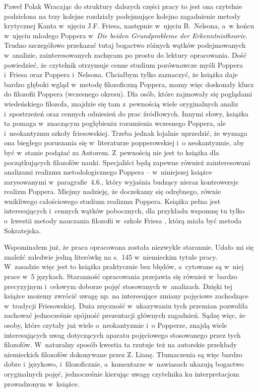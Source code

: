 \begin{newrevplenv}{Paweł Polak}
Wracając do struktury dalszych części pracy to jest ona czytelnie podzielona na trzy kolejne rozdziały podejmujące kolejno zagadnienie metody krytycznej Kanta w~ujęciu J.F. Friesa, następnie w~ujęciu B.~Nelsona, a~w końcu w~ujęciu młodego Poppera w~\textit{Die beiden Grundprobleme der Erkenntnistheorie}. Trudno szczegółowo przekazać tutaj bogactwo różnych wątków podejmowanych w~analizie, zainteresowanych zachęcam po prostu do lektury opracowania. Dość powiedzieć, że czytelnik otrzymuje cenne studium porównawcze myśli Poppera i~Friesa oraz Poppera i~Nelsona. Chciałbym tylko zaznaczyć, że książka daje bardzo głęboki wgląd w~metodę filozoficzną Poppera, mamy więc doskonały klucz do filozofii Poppera (wczesnego okresu). Dla osób, które zajmowały się poglądami wiedeńskiego filozofa, znajdzie się tam z~pewnością wiele oryginalnych analiz i~spostrzeżeń oraz cennych odniesień do prac źródłowych. Innymi słowy, książka ta pomaga w~znaczącym pogłębieniu rozumienia wczesnego Poppera, ale i~neokantyzmu szkoły friesowskiej. Trzeba jednak lojalnie uprzedzić, że wymaga ona biegłego poruszania się w~literaturze popperowskiej i~o neokantyzmie, aby być w~stanie podążać za Autorem. Z~pewnością nie jest to książka dla początkujących filozofów nauki. Specjaliści będą zapewne również zainteresowani analizami realizmu metodologicznego Poppera -- w~niniejszej książce zarysowanymi w~paragrafie~4.6., który wyjaśnia budzący nieraz kontrowersje realizm Poppera. Miejmy nadzieję, że doczekamy się odrębnego, równie wnikliwego całościowego studium realizmu Poppera. Książka pełna jest interesujących i~cennych wątków pobocznych, dla przykładu wspomnę tu tylko o~kwestii metody nauczania filozofii w~szkole Friesa
\parencite[][s.~87]{liana_filozoficzne_2021}, %
 którą miała być metoda Sokratejska.

Wspominałem już, że praca opracowana została niezwykle starannie. Udało mi się znaleźć zaledwie jedną literówkę na s.~145 w~niemieckim tytule pracy. W~zasadzie więc jest to książka praktycznie bez błędów, a~cytowane są w~niej prace w~5 językach. Staranność opracowania przejawia się również w~bardzo precyzyjnym i~celowym doborze pojęć stosowanych w~analizach. Dzięki tej książce możemy zwrócić uwagę np. na interesujące zmiany pojęciowe zachodzące w~tradycji Friesowskiej. Duża zręczność w~ukazywaniu tych przemian pozwoliła zachować jednocześnie spójność prezentacji głównych zagadnień. Sądzę więc, że osoby, które czytały już wiele o~neokantyzmie i~o Popperze, znajdą wiele interesujących uwag dotyczących aparatu pojęciowego stosowanego przez tych filozofów. W~naturalny sposób kwestia ta rzutuje też na autorskie przekłady niemieckich filozofów dokonywane przez Z. Lianę. Tłumaczenia są więc bardzo dobre i~językowo, i~filozoficznie, a~komentarze w~nawiasach ukazują bogactwo oryginalnych pojęć, jednocześnie kierując uwagę czytelnika ku interpretacjom prowadzonym w~książce.


\end{newrevplenv}
